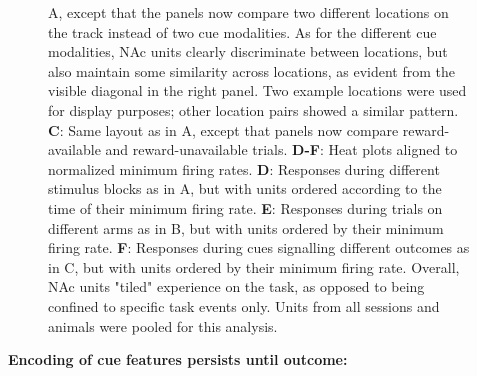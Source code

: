 \documentclass[11pt]{article}
\newcommand{\bsf}[1]{\textbf{#1}}
\begin{document}
\begin{figure}[ht!]
{A, except that the panels now compare two different locations on the track
instead of two cue modalities. As for the different cue modalities, NAc units
clearly discriminate between locations, but also maintain some similarity
across locations, as evident from the visible diagonal in the right panel. Two
example locations were used for display purposes; other location pairs showed
a similar pattern. \bsf{C}: Same layout as in A, except that panels now
compare reward-available and reward-unavailable trials. \bsf{D-F}: Heat plots
aligned to normalized minimum firing rates. \bsf{D}: Responses during
different stimulus blocks as in A, but with units ordered according to the
time of their minimum firing rate. \bsf{E}: Responses during trials on
different arms as in B, but with units ordered by their minimum firing
rate. \bsf{F}: Responses during cues signalling different outcomes as in C,
but with units ordered by their minimum firing rate. Overall, NAc units
"tiled" experience on the task, as opposed to being confined to specific task
events only. Units from all sessions and animals were pooled for this
analysis.}
\label{fig:tiling}
\end{figure} \clearpage

{\bf Encoding of cue features persists until outcome:}
\end{document}

